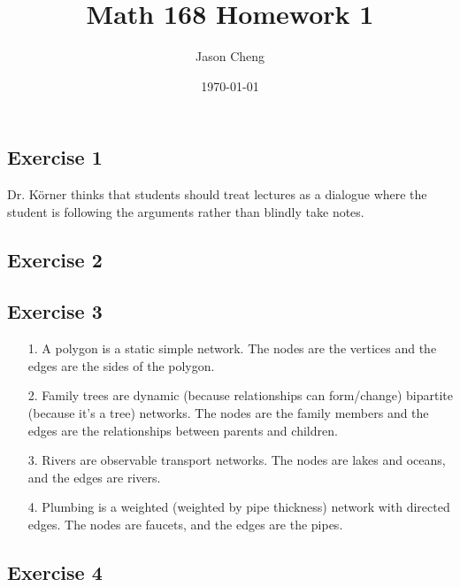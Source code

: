 \documentclass{article}
\title{Math 168 Homework 1}
\author{Jason Cheng}
\date{\today}
\begin{document}
\maketitle

\subsection*{Exercise 1}

Dr. Körner thinks that students should treat lectures as a dialogue where the
student is following the arguments rather than blindly take notes.

\newpage

\subsection*{Exercise 2}

\newpage

\subsection*{Exercise 3}

\begin{enumerate}
  \item[1.]
  A polygon is a static simple network. The nodes are the vertices and the edges
  are the sides of the polygon.
  
  \item[2.]
  Family trees are dynamic (because relationships can form/change) bipartite
  (because it's a tree) networks. The nodes are the family members and the edges
  are the relationships between parents and children.

  \item[3.]
  Rivers are observable transport networks. The nodes are lakes and oceans, and
  the edges are rivers.

  \item[4.]
  Plumbing is a weighted (weighted by pipe thickness) network with directed
  edges. The nodes are faucets, and the edges are the pipes.
\end{enumerate}

\newpage

\subsection*{Exercise 4}
\end{document}
